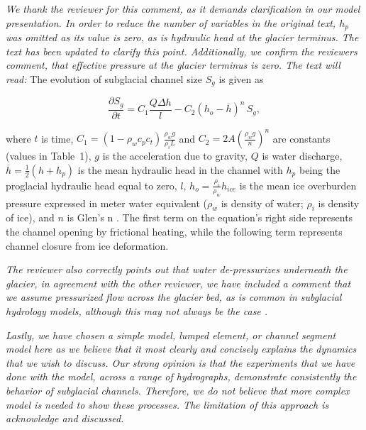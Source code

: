 \documentclass[11pt]{article}
\begin{document}
\begin{itemize}
  \textit{We thank the reviewer for this comment, as it demands clarification in our model presentation. In order to reduce the number of variables in the original text, $h_p$ was omitted as its value is zero, as is hydraulic head at the glacier terminus. The text has been updated to clarify this point.
    Additionally, we confirm the reviewers comment, that effective pressure at the glacier terminus is zero. The text will read:}
  The evolution of subglacial channel size $S_g$ is given as
  \begin{linenomath*}
    \begin{equation}
      \label{eq:dS_dt}
      \frac{\partial S_g}{\partial t} = C_1 \frac{Q \Delta h}{l} - C_2 \left(h_{o}-\overline{h}\right)^n\,S_g,
    \end{equation}
  \end{linenomath*}
  \noindent where $t$ is time, $C_1= (1-\rho_wc_pc_t)\,\frac{\rho_wg}{\rho_iL}$ and $C_2=2A(\frac{\rho_wg}{n})^n$ are constants (values in Table~1), $g$ is the acceleration due to gravity, $Q$ is water discharge, $\overline{h}=\frac{1}{2}(h+h_p)$ is the mean hydraulic head in the channel with $h_p$ being the proglacial hydraulic head equal to zero, $l$, $h_{o}= \frac{\rho_i}{\rho_w} h_{ice}$ is the mean ice overburden pressure expressed in meter water equivalent ($\rho_w$ is density of water; $\rho_i$ is density of ice), and $n$ is Glen's n \citep[usually $n=3$; ][]{glen1955}.
  The first term on the equation's right side represents the channel opening by frictional heating, while the following term represents channel closure from ice deformation.


  \textit{
    The reviewer also correctly points out that water de-pressurizes underneath the glacier, in agreement with the other reviewer, we have included a comment that we assume pressurized flow across the glacier bed, as is common in subglacial hydrology models, although this may not always be the case \citep{perolo2018}.
  }
  
  \textit{Lastly, we have chosen a simple model, lumped element, or channel segment model here as we believe that it most clearly and concisely explains the dynamics that we wish to discuss.
    Our strong opinion is that the experiments that we have done with the model, across a range of hydrographs, demonstrate consistently the behavior of subglacial channels.
    Therefore, we do not believe that more complex model is needed to show these processes.
    The limitation of this approach is acknowledge and discussed.
  }


\end{itemize}
\end{document}
